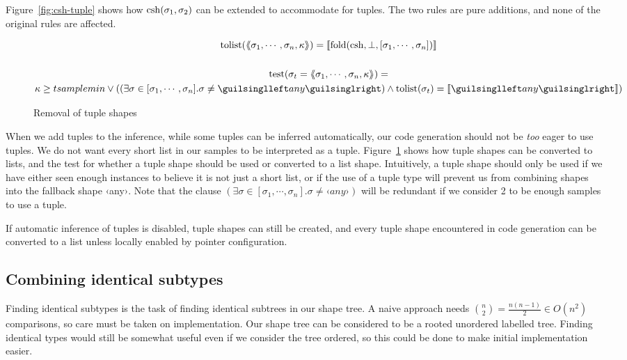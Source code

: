 Figure~\ref{fig:csh-tuple} shows how $\operatorname{csh}(\sigma_1, \sigma_2)$ can be extended to accommodate for tuples. The two rules are pure additions, and none of the original rules are affected.


\begin{figure}[ht!]
\begin{gather*}
\text{tolist}(\tupl{ \sigma_1, \cdots, \sigma_n, \kappa }) = \vect{\fold(\csh, \bot, [\sigma_1, \cdots, \sigma_n])} \\ \\
\text{test}(\sigma_t = \tupl{ \sigma_1, \cdots, \sigma_n, \kappa })  = \\
\kappa \geq tsamplemin \lor ((\exists \sigma \in [\sigma_1, \cdots, \sigma_n] . \sigma \neq ‹any›) \land \text{tolist}(\sigma_t) = \vect{‹any›})
\end{gather*}
\caption{Removal of tuple shapes}
\label{fig:remove-tuple}
\end{figure}

When we add tuples to the inference, while some tuples can be inferred automatically, our code generation should not be \emph{too} eager to use tuples. We do not want every short list in our samples to be interpreted as a tuple. Figure~\ref{fig:remove-tuple} shows how tuple shapes can be converted to lists, and the test for whether a tuple shape should be used or converted to a list shape. Intuitively, a tuple shape should only be used if we have either seen enough instances to believe it is not just a short list, or if the use of a tuple type will prevent us from combining shapes into the fallback shape ‹any›. Note that the clause $(\exists \sigma \in [\sigma_1, \cdots, \sigma_n] . \sigma \neq ‹any›)$ will be redundant if we consider 2 to be enough samples to use a tuple.

If automatic inference of tuples is disabled, tuple shapes can still be created, and every tuple shape encountered in code generation can be converted to a list unless locally enabled by pointer configuration.

\subsection{Combining identical subtypes}

Finding identical subtypes is the task of finding identical subtrees in our shape tree. A naive approach needs $\binom{n}{2} = \frac{n(n-1)}{2} \in O(n^2)$ comparisons, so care must be taken on implementation. Our shape tree can be considered to be a rooted unordered labelled tree. Finding identical types would still be somewhat useful even if we consider the tree ordered, so this could be done to make initial implementation easier.

